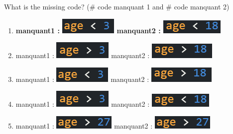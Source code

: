 \documentclass[14pt]{extarticle}
\begin{document}
What is the missing code? (\# code manquant 1 and \# code manquant 2)
\begin{enumerate}[label=\alph*)]
    \item \textbf{manquant1 : \includegraphics[width=0.2\linewidth]{images/posttest/_Q6_B.png} manquant2 :   \includegraphics[width=0.2\linewidth]{images/posttest/_Q6_C.png} }    
    \item manquant1 : \includegraphics[width=0.2\linewidth]{images/posttest/_Q6_A.png} manquant2 :   \includegraphics[width=0.2\linewidth]{images/posttest/_Q6_D.png} 
    \item manquant1 : \includegraphics[width=0.2\linewidth]{images/posttest/_Q6_B.png} manquant2 :   \includegraphics[width=0.2\linewidth]{images/posttest/_Q6_D.png} 
    \item manquant1 : \includegraphics[width=0.2\linewidth]{images/posttest/_Q6_A.png} manquant2 :   \includegraphics[width=0.2\linewidth]{images/posttest/_Q6_C.png} 
    \item manquant1 : \includegraphics[width=0.2\linewidth]{images/posttest/_Q6_E.png} manquant2 :   \includegraphics[width=0.2\linewidth]{images/posttest/_Q6_E.png} 
\end{enumerate}
\end{document}

